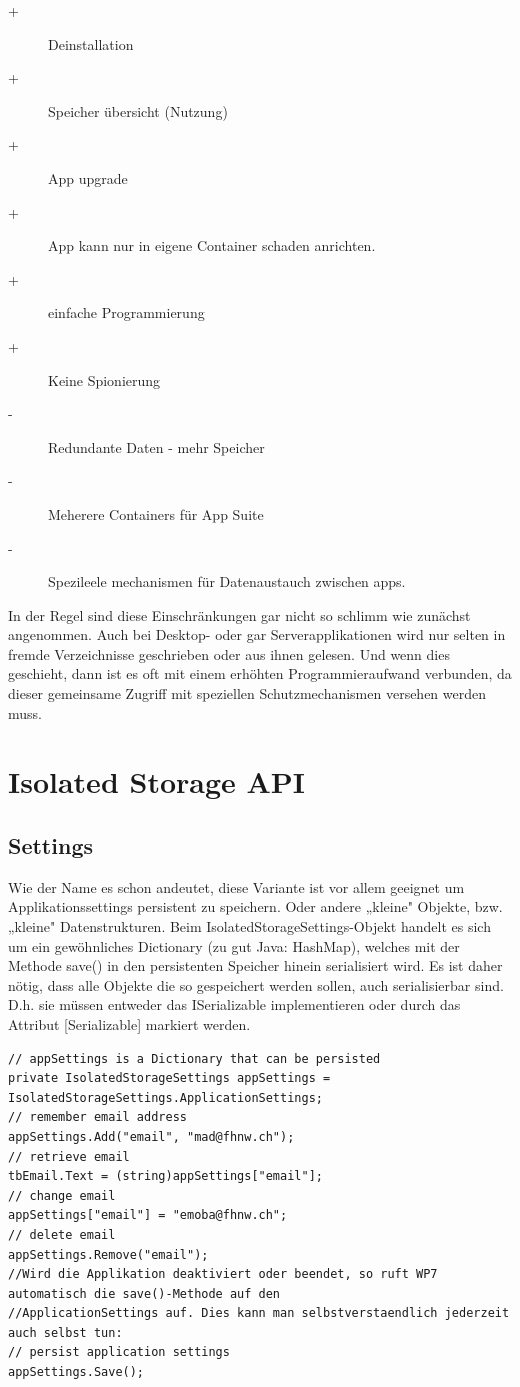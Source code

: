 \documentclass[a4paper,10pt]{scrreprt}
\begin{document}
\begin{description}
 \item [+] Deinstallation
 \item[+] Speicher übersicht (Nutzung)
 \item[+] App upgrade
 \item[+] App kann nur in eigene Container schaden anrichten.
 \item[+] einfache Programmierung
 \item[+] Keine Spionierung
 \item[-] Redundante Daten - mehr Speicher
 \item[-] Meherere Containers für App Suite
 \item[-] Spezileele mechanismen für Datenaustauch zwischen apps.
\end{description}

In der Regel sind diese Einschränkungen gar nicht so schlimm wie zunächst angenommen. Auch bei Desktop-
oder gar Serverapplikationen wird nur selten in fremde Verzeichnisse geschrieben oder aus ihnen gelesen. Und
wenn dies geschieht, dann ist es oft mit einem erhöhten Programmieraufwand verbunden, da dieser
gemeinsame Zugriff mit speziellen Schutzmechanismen versehen werden muss.


\section{Isolated Storage API}

\subsection{Settings}
Wie der Name es schon andeutet, diese Variante ist vor allem geeignet um Applikationssettings persistent zu
speichern. Oder andere „kleine" Objekte, bzw. „kleine" Datenstrukturen. Beim IsolatedStorageSettings-Objekt
handelt es sich um ein gewöhnliches Dictionary (zu gut Java: HashMap), welches mit der Methode save() in den
persistenten Speicher hinein serialisiert wird. Es ist daher nötig, dass alle Objekte die so gespeichert werden
sollen, auch serialisierbar sind. D.h. sie müssen entweder das ISerializable implementieren oder durch
das Attribut [Serializable] markiert werden.

\begin{lstlisting}[caption=Isolated Storage Settings]
// appSettings is a Dictionary that can be persisted
private IsolatedStorageSettings appSettings = IsolatedStorageSettings.ApplicationSettings;
// remember email address
appSettings.Add("email", "mad@fhnw.ch");
// retrieve email
tbEmail.Text = (string)appSettings["email"];
// change email
appSettings["email"] = "emoba@fhnw.ch";
// delete email
appSettings.Remove("email");
//Wird die Applikation deaktiviert oder beendet, so ruft WP7 automatisch die save()-Methode auf den
//ApplicationSettings auf. Dies kann man selbstverstaendlich jederzeit auch selbst tun:
// persist application settings
appSettings.Save();
\end{lstlisting}
\end{document}
